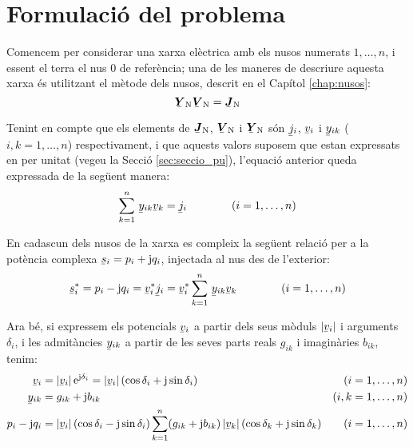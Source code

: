 \section{Formulació del problema}\label{sec:formul_prob} 

Comencem per considerar una xarxa elèctrica amb els nusos numerats
$1,\ldots,n$, i essent el terra el nus 0 de referència; una de les
maneres de descriure aquesta xarxa és utilitzant el mètode dels
nusos, descrit en el Capítol \ref{chap:nusos}:
\begin{equation}
    \mcmplx{Y}\ped{N} \mcmplx{V}\ped{N} = \mcmplx{J}\ped{N}
\end{equation}

Tenint en compte que els elements de $\mcmplx{J}\ped{N}$,
$\mcmplx{V}\ped{N}$ i $\mcmplx{Y}\ped{N}$ són $\cmplx{j}_i$,
$\cmplx{v}_i$ i  $\cmplx{y}_{ik}$ ($i,k=1,\ldots,n$) respectivament,
i que aquests valors suposem que estan expressats en per unitat (vegeu la
Secció \ref{sec:seccio_pu}), l'equació anterior queda expressada de
la següent manera:
\begin{equation}
    \sum^n_{k=1}\, \cmplx{y}_{ik} \cmplx{v}_k = \cmplx{j}_i \qquad\qquad (i=1,\ldots,n)
\end{equation}

En cadascun dels nusos de la xarxa es compleix la següent relació
per a la potència complexa $\cmplx{s}_i = p_i + \ju q_i$, injectada
al nus des de l'exterior:
\begin{equation}
    \cmplx{s}_i^* = p_i - \ju q_i = \cmplx{v}_i^* \cmplx{j}_i = \cmplx{v}_i^*
    \sum^n_{k=1}\, \cmplx{y}_{ik} \cmplx{v}_k \qquad\qquad (i=1,\ldots,n) \label{eq:sconj}
\end{equation}

Ara bé, si expressem els potencials $\cmplx{v}_i$ a partir dels seus mòduls $|\cmplx{v}_i|$
i arguments $\delta_i$, i les admitàncies $\cmplx{y}_{ik}$ a partir de les seves parts
reals $g_{ik}$ i imaginàries $b_{ik}$, tenim:
\begin{align}
    \cmplx{v}_i &=|\cmplx{v}_i|\, \eu^{\ju\delta_i} = |\cmplx{v}_i|\,
    (\cos\delta_i+\ju\sin\delta_i) & (i & =1,\ldots,n)\\
    \cmplx{y}_{ik} &= g_{ik} + \ju b_{ik} & (i,k & =1,\ldots,n) \\
    p_i - \ju q_i &= |\cmplx{v}_i|\, (\cos\delta_i - \ju\sin\delta_i) \sum^n_{k=1} (g_{ik} + \ju
    b_{ik}) \,|\cmplx{v}_k| \,(\cos\delta_k + \ju\sin\delta_k) & (i & =1,\ldots,n)
\end{align}

